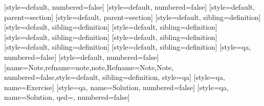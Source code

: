 [style=default, numbered=false]
[style=default, numbered=false]
[style=default, parent=section]
[style=default, parent=section]
[style=default, sibling=definition]
[style=default, sibling=definition]
[style=default, sibling=definition]
[style=default, sibling=definition]
[style=default, sibling=definition]
[style=default, sibling=definition]
[style=default, sibling=definition]
[style=qa, numbered=false]
[style=default, numbered=false]
[name=Note,refname={note,note},Refname={Note,Note},
numbered=false,style=default, sibling=definition, style=qa]
[style=qa, name=Exercise]
[style=qa, name=Solution, numbered=false]
[style=qa, name=Solution, qed=\triangle, numbered=false]
% 
% 
